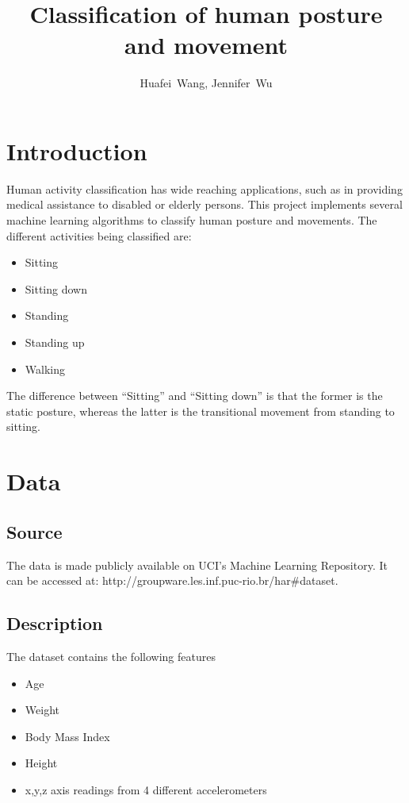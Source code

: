 \documentclass{cs229report}
\begin{document}
%
\title{Classification of human posture and movement}

\author{
  Huafei~Wang,
Jennifer~Wu}
\maketitle

\section{Introduction}
Human activity classification has wide reaching applications,
such as in providing medical assistance to disabled or elderly persons.
This project implements several machine learning algorithms to 
classify human posture and movements. The different activities being classified are: 
\begin{itemize}
  \item Sitting
  \item Sitting down
  \item Standing
  \item Standing up
  \item Walking
\end{itemize}
The difference between ``Sitting'' and ``Sitting down'' is that the former
is the static posture, whereas the latter is the transitional movement
from standing to sitting.
\section{Data}
\subsection{Source}
The data is made publicly available on UCI's Machine Learning Repository.
It can be accessed at: 
http://groupware.les.inf.puc-rio.br/har\#dataset.

\subsection{Description}
The dataset contains the following features
\begin{itemize}
  \item Age
  \item Weight
  \item Body Mass Index
  \item Height
  \item x,y,z axis readings from 4 different accelerometers
\end{itemize}
\end{document}
